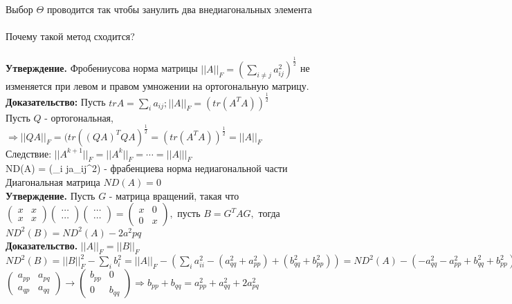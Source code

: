     Выбор $\Theta$ проводится так чтобы занулить два внедиагональных элемента\\ \\ 
    Почему такой метод сходится?\\ \\ 
\textbf{Утверждение.} Фробениусова норма матрицы \(||A||_F = (\sum_{i \neq j}a_{ij}^2)^{\frac{1}{2}}\) не изменяется при левом и правом умножении на ортогональную матрицу. \\
    
    \textbf{Доказательство:} Пусть \(tr A = \sum_ia_{ij}; ||A||_F = (tr(A^TA))^{\frac{1}{2}}\) \\
    Пусть \(Q\) - ортогональная, \(\Rightarrow ||QA||_F=(tr((QA)^TQA)^{\frac{1}{2}} = (tr(A^TA))^{\frac{1}{2}} = ||A||_F\) \\
    Следствие: \(||A^{k+1}||_F=||A^k||_F=\cdots=||A|||_F\) \\
    ND(A) = (\sum_{i \neq j}a_{ij}^2) - фрабенциева норма недиагональной части \\
    Диагональная матрица \(ND(A) = 0\) \\

    \textbf{Утверждение.} Пусть \(G\) - матрица вращений, такая что \(
    \begin{pmatrix}
      x & x \\ x & x   
    \end{pmatrix} 
    \begin{pmatrix}
        \cdots \\ \cdots
    \end{pmatrix}
    \begin{pmatrix}
        \cdots \\ \cdots
    \end{pmatrix} = 
    \begin{pmatrix}
      x & 0 \\ 0 & x   
    \end{pmatrix}, 
    \) пусть \(B = G^TAG,\) тогда \(ND^2(B) = ND^2(A) - 2a^2pq\) \\

    \textbf{Доказательство.} \(||A||_F = ||B||_F\)\\
    \(ND^2(B)=||B||_F^2-\sum_ib_i^2=||A||_F-(\sum_ia_{ii}^2 - (a_{qq}^2 + a_{pp}^2) + (b_{qq}^2 + b_{pp}^2)) = ND^2(A) - (-a_{qq}^2 - a_{pp}^2 + b_{qq}^2 + b_{pp}^2)\) \\
    \(\begin{pmatrix}
        a_{pp} & a_{pq} \\
        a_{qp} & a_{qq}
    \end{pmatrix} \rightarrow \begin{pmatrix}
        b_{pp} & 0 \\
        0 & b_{qq}
    \end{pmatrix}  \Rightarrow b_{pp} + b_{qq}=a^2_{pp} + a^2_{qq} + 2a_{pq}^2\) \\

